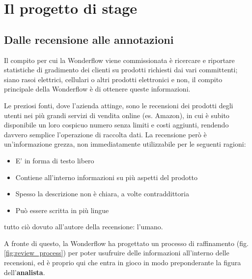 
\chapter{Il progetto di stage}
\label{cap:progetto-stage}

\section{Dalle recensione alle annotazioni}
Il compito per cui la Wonderflow viene commissionata è ricercare e riportare
statistiche di gradimento dei clienti su prodotti richiesti dai vari
committenti; siano rasoi elettrici, cellulari o altri prodotti elettronici e
non, il compito principale della Wonderflow è di ottenere queste informazioni.

Le preziosi fonti, dove l'azienda attinge, sono le recensioni dei prodotti
degli utenti nei più grandi servizi di vendita online (es. Amazon), in cui è
subito disponibile un loro cospicuo numero senza limiti e costi aggiunti,
rendendo davvero semplice l'operazione di raccolta dati. La recensione
però è un'informazione grezza, non immediatamente utilizzabile per le seguenti
ragioni:
\begin{itemize}
\item E' in forma di testo libero
\item Contiene all'interno informazioni su più aspetti del prodotto
\item Spesso la descrizione non è chiara, a volte contraddittoria
\item Può essere scritta in più lingue
\end{itemize}

tutto ciò dovuto all'autore della recensione: l'umano.

A fronte di questo, la Wonderflow ha progettato un processo di raffinamento
(fig. \ref{fig:review_process}) per poter usufruire delle informazioni
all'interno delle recensioni, ed è proprio qui che entra in gioco in modo
preponderante la figura dell'\textbf{analista}.

